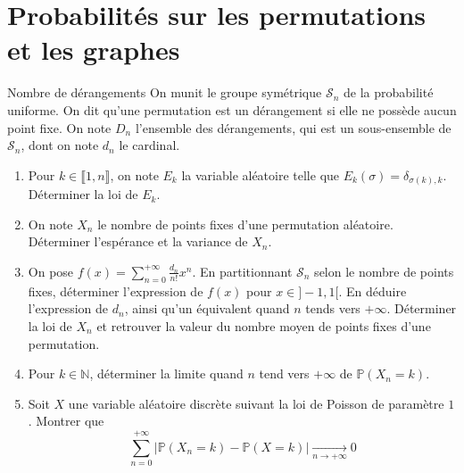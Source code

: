 \documentclass[french,a4paper]{article}
\renewcommand{\P}{\mathbb{P}}
\newcommand{\N}{\mathbb{N}}
\theoremstyle{plain}
\theoremstyle{definition}
\theoremstyle{remark}
\begin{document}
\section{Probabilités sur les permutations et les graphes}
\begin{ex}[Châteaux]{Nombre de dérangements}
	On munit le groupe symétrique $\mathcal{S}_n$ de la probabilité uniforme. On dit qu'une permutation est un dérangement si elle ne possède aucun point fixe. On note $D_n$ l'ensemble des dérangements, qui est un sous-ensemble de $\mathcal{S}_n$, dont on note $d_n$ le cardinal.
	\begin{enumerate}
		\item Pour $k\in\llbracket1,n\rrbracket$, on note $E_k$ la variable aléatoire telle que $E_k(\sigma)=\delta_{\sigma(k),k}$. Déterminer la loi de $E_k$.
		\item On note $X_n$ le nombre de points fixes d'une permutation aléatoire. Déterminer l'espérance et la variance de $X_n$.
		\item On pose $f(x)=\displaystyle\sum_{n=0}^{+\infty}\frac{d_n}{n!}x^n$. En partitionnant $\mathcal{S}_n$ selon le nombre de points fixes, déterminer l'expression de $f(x)$ pour $x\in]-1,1[$. En déduire l'expression de $d_n$, ainsi qu'un équivalent quand $n$ tends vers $+\infty$. Déterminer la loi de $X_n$ et retrouver la valeur du nombre moyen de points fixes d'une permutation.
		\item Pour $k\in\N$, déterminer la limite quand $n$ tend vers $+\infty$ de $\P(X_n=k)$.
		\item Soit $X$ une variable aléatoire discrète suivant la loi de Poisson de paramètre $1$. Montrer que $$\sum_{n=0}^{+\infty}\lvert\P(X_n=k)-\P(X=k)\rvert\xrightarrow[n\to+\infty]{}0$$
	\end{enumerate}
\end{ex}
\end{document}
